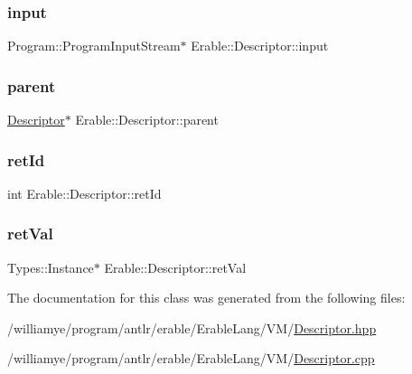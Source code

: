 \mbox{\label{class_erable_1_1_descriptor_a75e285ecacfb1ac394fe90d178be84c4}} 
\subsubsection{\texorpdfstring{input}{input}}
{\footnotesize\ttfamily Program\+::\+Program\+Input\+Stream$\ast$ Erable\+::\+Descriptor\+::input\hspace{0.3cm}{\ttfamily [private]}}

\mbox{\label{class_erable_1_1_descriptor_ac7d55cb4c5fb036dccc4310a7878ffab}} 
\subsubsection{\texorpdfstring{parent}{parent}}
{\footnotesize\ttfamily \mbox{\hyperlink{class_erable_1_1_descriptor}{Descriptor}}$\ast$ Erable\+::\+Descriptor\+::parent\hspace{0.3cm}{\ttfamily [private]}}

\mbox{\label{class_erable_1_1_descriptor_ae5ae8353191e79f315d97f5b752c8e3e}} 
\subsubsection{\texorpdfstring{retId}{retId}}
{\footnotesize\ttfamily int Erable\+::\+Descriptor\+::ret\+Id\hspace{0.3cm}{\ttfamily [private]}}

\mbox{\label{class_erable_1_1_descriptor_a1c1bf3943d3d7cbd9776eccba247182f}} 
\subsubsection{\texorpdfstring{retVal}{retVal}}
{\footnotesize\ttfamily Types\+::\+Instance$\ast$ Erable\+::\+Descriptor\+::ret\+Val\hspace{0.3cm}{\ttfamily [private]}}



The documentation for this class was generated from the following files\+:\begin{DoxyCompactItemize}
\item 
/williamye/program/antlr/erable/\+Erable\+Lang/\+V\+M/\mbox{\hyperlink{_descriptor_8hpp}{Descriptor.\+hpp}}\item 
/williamye/program/antlr/erable/\+Erable\+Lang/\+V\+M/\mbox{\hyperlink{_descriptor_8cpp}{Descriptor.\+cpp}}\end{DoxyCompactItemize}
